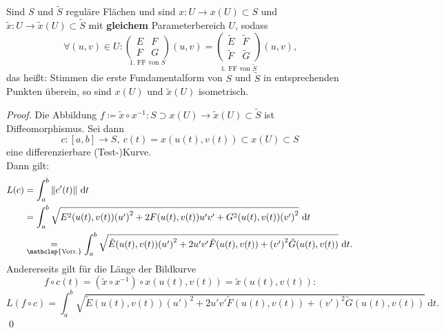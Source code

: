\begin{theorem}
  Sind \( S \) und \( \tilde{S} \) reguläre Flächen und sind \( x: U \to x(U) \subset S \) und \( \tilde{x}: U \to \tilde{x}(U) \subset \tilde{S} \) mit \textbf{gleichem} Parameterbereich \( U \), sodass
  \begin{equation*}
    \forall (u,v) \in U : \underset{\text{1. FF von } S}{\begin{pmatrix}
      E & F \\
      F & G
    \end{pmatrix}}(u,v) = \underset{\text{1. FF von } \tilde{S}}{\begin{pmatrix}
      \tilde{E} & \tilde{F} \\
      \tilde{F} & \tilde{G}
    \end{pmatrix}}(u,v)\text{,}
  \end{equation*}
  das heißt: Stimmen die erste Fundamentalform von \( S \) und \( \tilde{S} \) in entsprechenden Punkten überein, so sind \( x(U) \) und \( \tilde{x}(U) \) isometrisch.
  \begin{proof}
    Die Abbildung \( f \coloneqq \tilde{x} \circ x^{-1}: S \supset x(U) \to \tilde{x}(U) \subset \tilde{S} \) ist Diffeomorphismus. Sei dann
    \begin{equation*}
      c: [a,b] \to S, \ c(t) = x(u(t),v(t)) \subset x(U) \subset S
    \end{equation*}
    eine differenzierbare (Test-)Kurve. \\
    Dann gilt:
    \begin{align*}
      L(c) &= \int_a^b \Vert c'(t) \Vert \ \text{d}t \\
      &= \int_a^b \sqrt{E^2(u(t),v(t)){(u')}^2 + 2F(u(t),v(t))u'v' + G^2(u(t),v(t)){(v')}^2} \ \text{d}t \\
      &\underset{\mathclap{\text{Vorr.}}}{=} \int_a^b \sqrt{\tilde{E}(u(t),v(t)){(u')}^2 + 2u'v'\tilde{F}(u(t),v(t)) + {(v')}^2\tilde{G}(u(t),v(t))} \ \text{d}t\text{.}
    \end{align*}
    Andererseits gilt für die Länge der Bildkurve
    \begin{equation*}
      f \circ c(t) = (\tilde{x} \circ x^{-1}) \circ x(u(t),v(t)) = \tilde{x}(u(t),v(t))\text{:}
    \end{equation*}
    \begin{equation*}
      L(f \circ c) = \int_a^b \sqrt{\tilde{E}(u(t),v(t)){(u')}^2 + 2u'v' \tilde{F}(u(t),v(t)) + {(v')}^2\tilde{G}(u(t),v(t))} \ \text{d}t\text{.}
    \end{equation*}
    \qed{}
  \end{proof}
\end{theorem}

